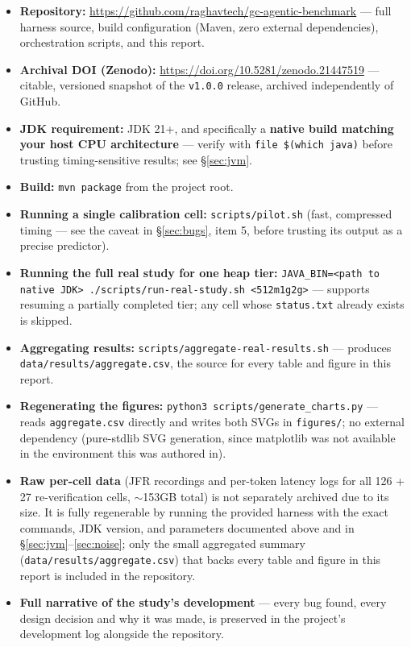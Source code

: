 \documentclass[11pt]{article}
\newcommand{\code}[1]{\texttt{#1}}
\begin{document}
\begin{itemize}[leftmargin=1.5em]
  \item \textbf{Repository:} \url{https://github.com/raghavtech/gc-agentic-benchmark} --- full
    harness source, build configuration (Maven, zero external dependencies), orchestration
    scripts, and this report.
  \item \textbf{Archival DOI (Zenodo):} \url{https://doi.org/10.5281/zenodo.21447519} ---
    citable, versioned snapshot of the \code{v1.0.0} release, archived independently of GitHub.
  \item \textbf{JDK requirement:} JDK 21+, and specifically a \textbf{native build matching your
    host CPU architecture} --- verify with \code{file \$(which java)} before trusting
    timing-sensitive results; see \S\ref{sec:jvm}.
  \item \textbf{Build:} \code{mvn package} from the project root.
  \item \textbf{Running a single calibration cell:} \code{scripts/pilot.sh} (fast, compressed
    timing --- see the caveat in \S\ref{sec:bugs}, item 5, before trusting its output as a
    precise predictor).
  \item \textbf{Running the full real study for one heap tier:}
    \code{JAVA\_BIN=<path to native JDK> ./scripts/run-real-study.sh <512m\textbar 1g\textbar 2g>}
    --- supports resuming a partially completed tier; any cell whose \code{status.txt} already
    exists is skipped.
  \item \textbf{Aggregating results:} \code{scripts/aggregate-real-results.sh} --- produces
    \code{data/results/aggregate.csv}, the source for every table and figure in this report.
  \item \textbf{Regenerating the figures:} \code{python3 scripts/generate\_charts.py} --- reads
    \code{aggregate.csv} directly and writes both SVGs in \code{figures/}; no external dependency
    (pure-stdlib SVG generation, since matplotlib was not available in the environment this was
    authored in).
  \item \textbf{Raw per-cell data} (JFR recordings and per-token latency logs for all 126 + 27
    re-verification cells, $\sim$153GB total) is not separately archived due to its size. It is
    fully regenerable by running the provided harness with the exact commands, JDK version, and
    parameters documented above and in \S\ref{sec:jvm}--\ref{sec:noise}; only the small aggregated
    summary (\code{data/results/aggregate.csv}) that backs every table and figure in this report
    is included in the repository.
  \item \textbf{Full narrative of the study's development} --- every bug found, every design
    decision and why it was made, is preserved in the project's development log alongside the
    repository.
\end{itemize}
\end{document}
